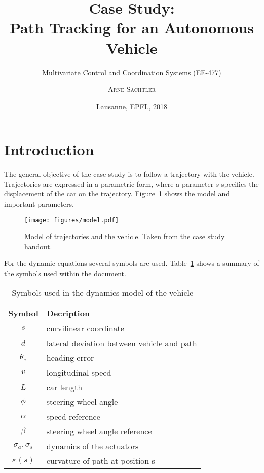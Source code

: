 \documentclass{scrartcl}
\title{Case Study:\\Path Tracking for an Autonomous Vehicle}
\subtitle{Multivariate Control and Coordination Systems (EE-477)}
\author{\textsc{Arne Sachtler}}
\date{Lausanne, EPFL, 2018}
\begin{document}
\maketitle
\setcounter{section}{-1}
\section{Introduction}
The general objective of the case study is to follow a trajectory with the vehicle.
Trajectories are expressed in a parametric form, where a parameter $s$ specifies the displacement of the car on the trajectory.
Figure~\ref{fig:vehicle_model} shows the model and important parameters.
\begin{figure}[h]
	\centering
	\texttt{[image: figures/model.pdf]}
	\caption{Model of trajectories and the vehicle. Taken from the case study handout.}
	\label{fig:vehicle_model}
\end{figure}
For the dynamic equations several symbols are used. 
Table~\ref{tab:symbols} shows a summary of the symbols used within the document.
\begin{table}[h]
	\centering
	\begin{tabular}{c|l}
	\hline
	\hline
	\textbf{Symbol} & \textbf{Decription}\\
	\hline
		 $s$ & curvilinear coordinate\\
		 $d$ & lateral deviation between vehicle and path\\
		 $\theta_e$ & heading error\\
		 $v$ & longitudinal speed\\
		 $L$ & car length\\
		 $\phi$ & steering wheel angle\\
		 $\alpha$ & speed reference\\
		 $\beta$ & steering wheel angle reference\\
		 $\sigma_a, \sigma_s$ & dynamics of the actuators\\
		 $\kappa(s)$ & curvature of path at position s\\
	\hline
	\hline
	\end{tabular}
	\caption{Symbols used in the dynamics model of the vehicle}
	\label{tab:symbols}
\end{table}
\end{document}
